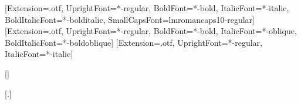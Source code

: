 \providecommand{\notenumber}{}

\usepackage{fontspec}
\usepackage{xcolor}
\setmainfont{lmroman10}[Extension=.otf, UprightFont=*-regular, BoldFont=*-bold,
  ItalicFont=*-italic, BoldItalicFont=*-bolditalic, SmallCapsFont=lmromancaps10-regular]
\setsansfont{lmsans10}[Extension=.otf, UprightFont=*-regular, BoldFont=*-bold,
  ItalicFont=*-oblique, BoldItalicFont=*-boldoblique]
\setmonofont{lmmono10}[Extension=.otf, UprightFont=*-regular, ItalicFont=*-italic]

\usepackage{newunicodechar}


\usepackage{titlesec}
\setcounter{secnumdepth}{1}
\titleformat{\section}{\normalfont\Large\scshape\color{accent}}{\thesection}{0.8em}{}[\vspace{2pt}{\color{rulegray}\titlerule[0.4pt]}]
\titleformat{\subsection}[runin]{\normalfont\bfseries}{}{0pt}{}[.]

